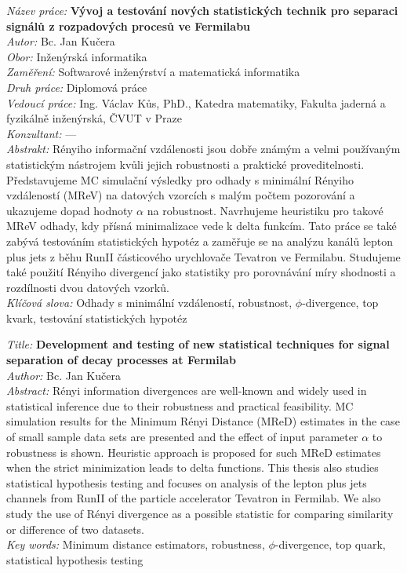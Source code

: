 {
\setlength{\parindent}{0pt}

\textit{Název práce:}
\textbf{Vývoj a testování nových statistických technik pro separaci signálů z rozpadových procesů ve Fermilabu} \\

\textit{Autor:} Bc. Jan Kučera \\

\textit{Obor:} Inženýrská informatika \\

\textit{Zaměření:}  Softwarové inženýrství a matematická informatika \\

\textit{Druh práce:} Diplomová práce \\

\textit{Vedoucí práce:}  Ing. Václav Kůs, PhD., Katedra matematiky, Fakulta jaderná a fyzikálně inženýrská, ČVUT v Praze\\

\textit{Konzultant:}  --- \\

\textit{Abstrakt:} 
Rényiho informační vzdálenosti jsou dobře známým a velmi používaným statistickým nástrojem kvůli jejich robustnosti a praktické proveditelnosti. Představujeme MC simulační výsledky pro odhady s minimální Rényiho vzdáleností (MReV) na datových vzorcích s malým počtem pozorování a ukazujeme dopad hodnoty $\alpha$ na robustnost. Navrhujeme heuristiku pro takové MReV odhady,  kdy přísná minimalizace vede k delta funkcím. Tato práce se také zabývá testováním statistických hypotéz a zaměřuje se na analýzu kanálů lepton plus jets z běhu RunII částicového urychlovače Tevatron ve Fermilabu. Studujeme také použití Rényiho divergencí jako statistiky pro porovnávání míry shodnosti a rozdílnosti dvou datových vzorků.\\

\textit{Klíčová slova:}  Odhady s minimální vzdáleností, robustnost, $\phi$-divergence, top kvark, testování statistických hypotéz

\vspace{1.4cm}

\textit{Title:}
\textbf{Development and testing of new statistical techniques for signal separation of decay processes at Fermilab} \\

\textit{Author:} Bc. Jan Kučera\\

\textit{Abstract:} 
Rényi information divergences are well-known and widely used in statistical inference due to their robustness and practical feasibility. MC simulation results for the Minimum
Rényi Distance (MReD) estimates in the case of small sample data sets are presented and the
effect of input parameter $\alpha$ to robustness is shown. Heuristic approach is proposed for such MReD estimates when the strict minimization leads to delta functions. This thesis also studies statistical hypothesis testing and focuses on analysis of the lepton plus jets channels from RunII of the particle accelerator Tevatron in Fermilab. We also study the use of Rényi divergence as a possible statistic for comparing similarity or difference of two datasets.
 \\

\textit{Key words:}  Minimum distance estimators, robustness, $\phi$-divergence, top quark, statistical hypothesis testing
}

